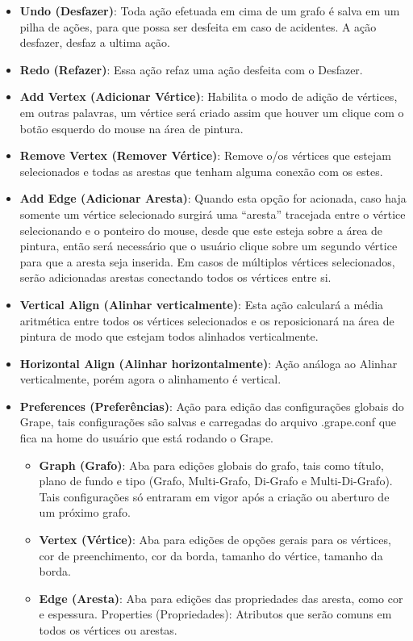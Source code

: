 \documentclass[a4paper]{abnt}
\begin{document}
\begin{itemize}
    \item \textbf{Undo (Desfazer)}: Toda ação efetuada em cima de um grafo é salva em um pilha de ações, para que possa ser desfeita em caso de acidentes. A ação desfazer, desfaz a ultima ação.
    \item \textbf{Redo (Refazer)}: Essa ação refaz uma ação desfeita com o Desfazer.
    \item \textbf{Add Vertex (Adicionar Vértice)}: Habilita o modo de adição de vértices, em outras palavras, um vértice será criado assim que houver um clique com o botão esquerdo do mouse na área de pintura.
    \item \textbf{Remove Vertex (Remover Vértice)}: Remove o/os vértices que estejam selecionados e todas as arestas que tenham alguma conexão com os estes.
    \item \textbf{Add Edge (Adicionar Aresta)}: Quando esta opção for acionada, caso haja somente um vértice selecionado surgirá uma “aresta” tracejada entre o vértice selecionando e o ponteiro do mouse, desde que este esteja sobre a área de pintura, então será necessário que o usuário clique sobre um segundo vértice para que a aresta seja inserida. Em casos de múltiplos vértices selecionados, serão adicionadas arestas conectando todos os vértices entre si.
    \item \textbf{Vertical Align (Alinhar verticalmente)}: Esta ação calculará a média aritmética entre todos os vértices selecionados e os reposicionará na área de pintura de modo que estejam todos alinhados verticalmente.
    \item \textbf{Horizontal Align (Alinhar horizontalmente)}: Ação análoga ao Alinhar verticalmente, porém agora o alinhamento é vertical.
    \item \textbf{Preferences (Preferências)}: Ação para edição das configurações globais do Grape, tais configurações são salvas e carregadas do arquivo .grape.conf que fica na home do usuário que está rodando o Grape.
    \begin{itemize}
        \item \textbf{Graph (Grafo)}: Aba para edições globais do grafo, tais como título, plano de fundo e tipo (Grafo, Multi-Grafo, Di-Grafo e Multi-Di-Grafo). Tais configurações só entraram em vigor após a criação ou aberturo de um próximo grafo.
        \item \textbf{Vertex (Vértice)}: Aba para edições de opções gerais para os vértices, cor de preenchimento, cor da borda, tamanho do vértice, tamanho da borda.
        \item \textbf{Edge (Aresta)}: Aba para edições das propriedades das aresta, como cor e espessura.
        Properties (Propriedades): Atributos que serão comuns em todos os vértices ou arestas.
    \end{itemize}
\end{itemize}
\end{document}

